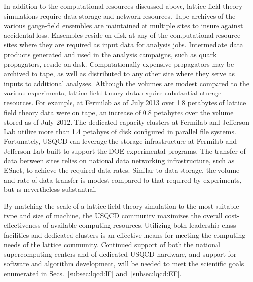 In addition to the computational resources discussed above, lattice field
theory simulations require data storage and network resources.  Tape archives
of the various gauge-field ensembles are maintained at multiple sites to
insure against accidental loss.  Ensembles reside on disk at any of the
computational resource sites where they are required as input data for
analysis jobs.  Intermediate data products generated and used in the analysis
campaigns, such as quark propagators, reside on disk.  Computationally
expensive propagators may be archived to tape, as well as distributed to any
other site where they serve as inputs to additional analyses.  Although the
volumes are modest compared to the various experiments, lattice field theory
data require substantial storage resources.  For example, at Fermilab as of
July 2013 over 1.8 petabytes of lattice field theory data were on tape, an
increase of 0.8 petabytes over the volume stored as of July 2012.  The
dedicated capacity clusters at Fermilab and Jefferson Lab utilize more than
1.4 petabyes of disk configured in parallel file systems.  Fortunately, USQCD
can leverage the storage infrastructure at Fermilab and Jefferson Lab built to
support the DOE experimental programs.  The transfer of data between sites
relies on national data networking infrastructure, such as ESnet, to achieve
the required data rates.  Similar to data storage, the volume and rate of data
transfer is modest compared to that required by experiments, but is
nevertheless substantial.

By matching the scale of a lattice field theory simulation to the most
suitable type and size of machine, the USQCD community maximizes the overall
cost-effectiveness of available computing resources.  Utilizing both
leadership-class facilities and dedicated clusters is an effective means for
meeting the computing needs of the lattice community.  Continued support of
both the national supercomputing centers and of dedicated USQCD hardware, and
support for software and algorithm development, will be needed to meet the
scientific goals enumerated in Secs.~\ref{subsec:lqcd:IF}
and~\ref{subsec:lqcd:EF}.


